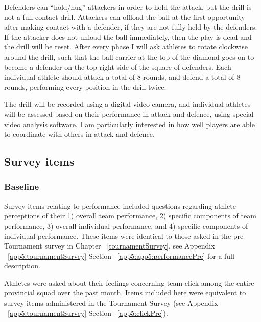 Defenders can “hold/hug” attackers in order to hold the attack, but the drill is not a full-contact drill.  Attackers can offload the ball at the first opportunity after making contact with a defender, if they are not fully held by the defenders.  If the attacker does not unload the ball immediately, then the play is dead and the drill will be reset.
After every phase I will ask athletes to rotate clockwise around the drill, such that the ball carrier at the top of the diamond goes on to become a defender on the top right side of the square of defenders. Each individual athlete should attack a total of 8 rounds, and defend a total of 8 rounds, performing every position in the drill twice.

The drill will be recorded using a digital video camera, and individual athletes will be assessed based on their performance in attack and defence, using special video analysis software. I am particularly interested in how well players are able to coordinate with others in attack and defence.





\subsection{\label{app6:surveyItems}Survey items}



\subsubsection{\label{app6:surveyItemsBaseline}Baseline}

Survey items relating to performance included questions regarding athlete perceptions of their 1) overall team performance, 2) specific components of team performance, 3) overall individual performance, and 4) specific components of individual performance.  These items were identical to those asked in the pre-Tournament survey in Chapter ~\ref{tournamentSurvey}, see Appendix ~\ref{app5:tournamentSurvey} Section ~\ref{app5:app5:performancePre} for a full description.

Athletes were asked about their feelings concerning team click among the entire provincial squad over the past month. Items included here were equivalent to survey items administered in the Tournament Survey (see Appendix ~\ref{app5:tournamentSurvey} Section ~\ref{app5:clickPre}).

